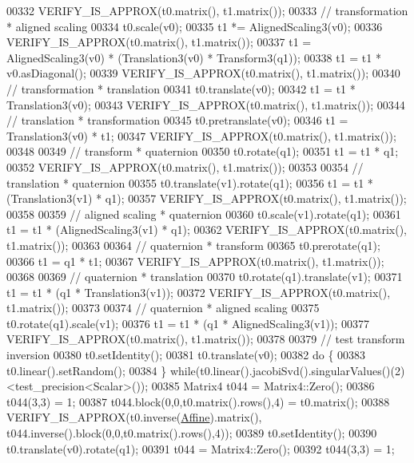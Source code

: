 \begin{DoxyCode}
00332   VERIFY\_IS\_APPROX(t0.matrix(), t1.matrix());
00333   \textcolor{comment}{// transformation * aligned scaling}
00334   t0.scale(v0);
00335   t1 *= AlignedScaling3(v0);
00336   VERIFY\_IS\_APPROX(t0.matrix(), t1.matrix());
00337   t1 = AlignedScaling3(v0) * (Translation3(v0) * Transform3(q1));
00338   t1 = t1 * v0.asDiagonal();
00339   VERIFY\_IS\_APPROX(t0.matrix(), t1.matrix());
00340   \textcolor{comment}{// transformation * translation}
00341   t0.translate(v0);
00342   t1 = t1 * Translation3(v0);
00343   VERIFY\_IS\_APPROX(t0.matrix(), t1.matrix());
00344   \textcolor{comment}{// translation * transformation}
00345   t0.pretranslate(v0);
00346   t1 = Translation3(v0) * t1;
00347   VERIFY\_IS\_APPROX(t0.matrix(), t1.matrix());
00348 
00349   \textcolor{comment}{// transform * quaternion}
00350   t0.rotate(q1);
00351   t1 = t1 * q1;
00352   VERIFY\_IS\_APPROX(t0.matrix(), t1.matrix());
00353 
00354   \textcolor{comment}{// translation * quaternion}
00355   t0.translate(v1).rotate(q1);
00356   t1 = t1 * (Translation3(v1) * q1);
00357   VERIFY\_IS\_APPROX(t0.matrix(), t1.matrix());
00358 
00359   \textcolor{comment}{// aligned scaling * quaternion}
00360   t0.scale(v1).rotate(q1);
00361   t1 = t1 * (AlignedScaling3(v1) * q1);
00362   VERIFY\_IS\_APPROX(t0.matrix(), t1.matrix());
00363 
00364   \textcolor{comment}{// quaternion * transform}
00365   t0.prerotate(q1);
00366   t1 = q1 * t1;
00367   VERIFY\_IS\_APPROX(t0.matrix(), t1.matrix());
00368 
00369   \textcolor{comment}{// quaternion * translation}
00370   t0.rotate(q1).translate(v1);
00371   t1 = t1 * (q1 * Translation3(v1));
00372   VERIFY\_IS\_APPROX(t0.matrix(), t1.matrix());
00373 
00374   \textcolor{comment}{// quaternion * aligned scaling}
00375   t0.rotate(q1).scale(v1);
00376   t1 = t1 * (q1 * AlignedScaling3(v1));
00377   VERIFY\_IS\_APPROX(t0.matrix(), t1.matrix());
00378 
00379   \textcolor{comment}{// test transform inversion}
00380   t0.setIdentity();
00381   t0.translate(v0);
00382   \textcolor{keywordflow}{do} \{
00383     t0.linear().setRandom();
00384   \} \textcolor{keywordflow}{while}(t0.linear().jacobiSvd().singularValues()(2)<test\_precision<Scalar>());
00385   Matrix4 t044 = Matrix4::Zero();
00386   t044(3,3) = 1;
00387   t044.block(0,0,t0.matrix().rows(),4) = t0.matrix();
00388   VERIFY\_IS\_APPROX(t0.inverse(\hyperlink{group__enums_ggaee59a86102f150923b0cac6d4ff05107a71e768e0581725d919d0b05f4cb83234}{Affine}).matrix(), t044.inverse().block(0,0,t0.matrix().rows(),4));
00389   t0.setIdentity();
00390   t0.translate(v0).rotate(q1);
00391   t044 = Matrix4::Zero();
00392   t044(3,3) = 1;

\end{DoxyCode}
